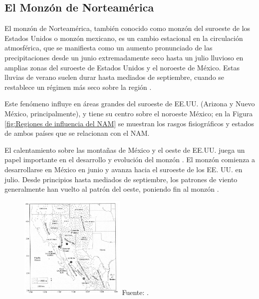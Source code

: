 \documentclass[12pt]{article}
\begin{document}
\subsection{El Monzón de Norteamérica}

El monzón de Norteamérica, también conocido como monzón del suroeste de los Estados Unidos o monzón mexicano, es un cambio estacional en la circulación atmosférica, que se manifiesta como un aumento pronunciado de las precipitaciones desde un junio extremadamente seco hasta un julio lluvioso en amplias zonas del suroeste de Estados Unidos y el noroeste de México. Estas lluvias de verano suelen durar hasta mediados de septiembre, cuando se restablece un régimen más seco sobre la región \cite{adams1997north}.

Este fenómeno influye en áreas grandes del suroeste de EE.UU. (Arizona y Nuevo México, principalmente), y tiene su centro sobre el noroeste México; en la Figura \ref{fig:Regiones de influencia del NAM} se muestran los rasgos fisiográficos y estados de ambos países que se relacionan con el NAM.

El calentamiento sobre las montañas de México y el oeste de EE.UU. juega un papel importante en el desarrollo y evolución del monzón \cite{CPC}. El monzón comienza a desarrollarse en México en junio y avanza hacia el suroeste de los EE. UU. en julio. Desde principios hasta mediados de septiembre, los patrones de viento generalmente han vuelto al patrón del oeste, poniendo fin al monzón \cite{Climategov}.

\begin{figure}[H]
	\begin{center}
 		\includegraphics[width = 0.45\textwidth]{Imagenes/Regiones de influencia NAM.png}
 		Fuente: \cite{adams1997north}.
	\end{center} 
\end{figure}
\end{document}
